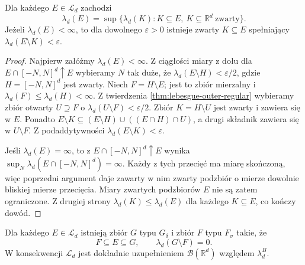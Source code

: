 \begin{twierdzenie}
\label{thm:lebesgue-inner-regular}
Dla każdego $E\in\mathcal L_d$ zachodzi
\begin{equation}\label{eq:inner-compact-regular}
\lambda_d(E)=\sup\{\lambda_d(K):K\subseteq E,
\ K\subseteq\mathbb R^d\ \text{zwarty}\}.
\end{equation}
Jeżeli $\lambda_d(E)<\infty$, to dla dowolnego
$\varepsilon>0$ istnieje zwarty $K\subseteq E$
spełniający $\lambda_d(E\setminus K)<\varepsilon$.
\end{twierdzenie}

\begin{proof}
Najpierw załóżmy $\lambda_d(E)<\infty$.
Z ciągłości miary z dołu dla
$E\cap[-N,N]^d\uparrow E$ wybieramy $N$ tak duże, że
$\lambda_d(E\setminus H)<\varepsilon/2$, gdzie
$H=[-N,N]^d$ jest zwarty.
Niech $F=H\setminus E$; jest to zbiór mierzalny
i $\lambda_d(F)\le\lambda_d(H)<\infty$.
Z twierdzenia \ref{thm:lebesgue-outer-regular}
wybieramy zbiór otwarty $U\supseteq F$ o
$\lambda_d(U\setminus F)<\varepsilon/2$.
Zbiór $K=H\setminus U$ jest zwarty i zawiera się
w $E$. Ponadto
$E\setminus K\subseteq(E\setminus H)
\cup((E\cap H)\cap U)$, a drugi składnik zawiera się
w $U\setminus F$. Z podaddytywności
$\lambda_d(E\setminus K)<\varepsilon$.

Jeśli $\lambda_d(E)=\infty$, to z
$E\cap[-N,N]^d\uparrow E$ wynika
$\sup_N\lambda_d(E\cap[-N,N]^d)=\infty$.
Każdy z tych przecięć ma miarę skończoną, więc
poprzedni argument daje zawarty w nim zwarty podzbiór
o mierze dowolnie bliskiej mierze przecięcia. Miary
zwartych podzbiorów $E$ nie są zatem ograniczone.
Z drugiej strony $\lambda_d(K)\le\lambda_d(E)$ dla
każdego $K\subseteq E$, co kończy dowód.
\end{proof}

\begin{twierdzenie}
\label{thm:lebesgue-completion}
Dla każdego $E\in\mathcal L_d$ istnieją
zbiór $G$ typu $G_\delta$ i zbiór $F$ typu $F_\sigma$
takie, że
\begin{equation}\label{eq:lebesgue-Borel-approx}
F\subseteq E\subseteq G,\qquad
\lambda_d(G\setminus F)=0.
\end{equation}
W konsekwencji $\mathcal L_d$ jest dokładnie
uzupełnieniem $\mathcal B(\mathbb R^d)$ względem
$\lambda_d^B$.
\end{twierdzenie}

